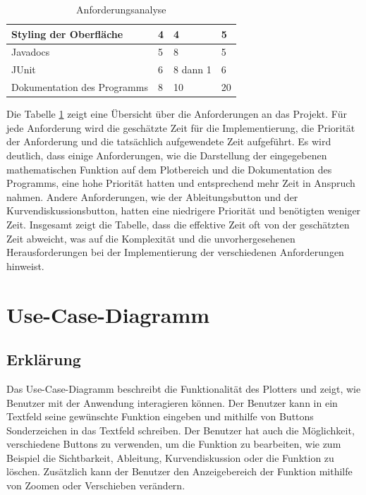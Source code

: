 \documentclass[a4paper]{article}
\begin{document}
\begin{table}[h]
\begin{tabular}{|p{5cm}|p{2cm}|p{2cm}|p{2cm}|}
		\hline
		Styling der Oberfläche                                                                                  & 4                        & 4                         & 5                       \\
		\hline
		Javadocs                                                                                                & 5                        & 8                         & 5                       \\
		\hline
		JUnit                                                                                                   & 6                        & 8 dann 1                  & 6                       \\
		\hline
		Dokumentation des Programms                                                                             & 8                        & 10                        & 20                      \\
		\hline
	\end{tabular}
	\caption{Anforderungsanalyse}
	\label{tab:anforderungsanalyse}
\end{table}

Die Tabelle \ref{tab:anforderungsanalyse} zeigt eine Übersicht über die Anforderungen an das Projekt. Für jede Anforderung wird die geschätzte Zeit für die Implementierung, die Priorität der Anforderung und die tatsächlich aufgewendete Zeit aufgeführt. Es wird deutlich, dass einige Anforderungen, wie die Darstellung der eingegebenen mathematischen Funktion auf dem Plotbereich und die Dokumentation des Programms, eine hohe Priorität hatten und entsprechend mehr Zeit in Anspruch nahmen. Andere Anforderungen, wie der Ableitungsbutton und der Kurvendiskussionsbutton, hatten eine niedrigere Priorität und benötigten weniger Zeit. Insgesamt zeigt die Tabelle, dass die effektive Zeit oft von der geschätzten Zeit abweicht, was auf die Komplexität und die unvorhergesehenen Herausforderungen bei der Implementierung der verschiedenen Anforderungen hinweist.

\newpage

\section{Use-Case-Diagramm}

\subsection{Erklärung}

Das Use-Case-Diagramm beschreibt die Funktionalität des Plotters und zeigt, wie Benutzer mit der Anwendung interagieren können. Der Benutzer kann in ein Textfeld seine gewünschte Funktion eingeben und mithilfe von Buttons Sonderzeichen in das Textfeld schreiben. Der Benutzer hat auch die Möglichkeit, verschiedene Buttons zu verwenden, um die Funktion zu bearbeiten, wie zum Beispiel die Sichtbarkeit, Ableitung, Kurvendiskussion oder die Funktion zu löschen. Zusätzlich kann der Benutzer den Anzeigebereich der Funktion mithilfe von Zoomen oder Verschieben verändern.
\end{document}
